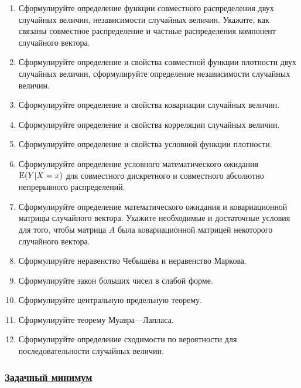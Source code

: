 \begin{enumerate}
\item Сформулируйте определение функции совместного распределения двух случайных величин, 
независимости случайных величин. 
Укажите, как связаны совместное распределение и частные распределения компонент случайного вектора.
\item Сформулируйте определение и свойства совместной функции плотности двух случайных величин, сформулируйте определение независимости случайных величин.
\item Сформулируйте определение и свойства ковариации случайных величин.
\item Сформулируйте определение и свойства корреляции случайных величин.
\item Сформулируйте определение и свойства условной функции плотности.
\item Сформулируйте определение условного математического ожидания $\operatorname{E}(Y|X=x)$ для совместного дискретного и совместного абсолютно непрерывного распределений.
\item Сформулируйте определение математического ожидания и ковариационной матрицы случайного
вектора. Укажите необходимые и достаточные условия для того, 
чтобы матрица $A$ была ковариационной матрицей некоторого случайного вектора.
\item Сформулируйте неравенство Чебышёва и неравенство Маркова.
\item Сформулируйте закон больших чисел в слабой форме.
\item Сформулируйте центральную предельную теорему.
\item Сформулируйте теорему Муавра—Лапласа.
\item Сформулируйте определение сходимости по вероятности для последовательности случайных величин.
\end{enumerate}

\newpage
\subsubsection*{\hyperref[sec:sol_minimum_kr_02]{Задачный минимум}}\label{sec:minimum_kr_02}

